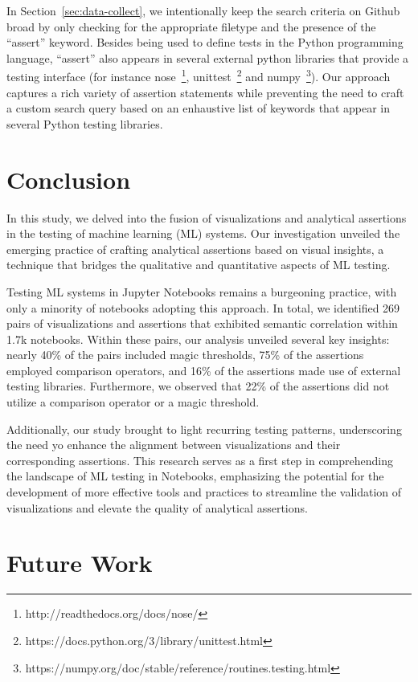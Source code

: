 \documentclass[conference]{IEEEtran}
\begin{document}
In Section~\ref{sec:data-collect}, we intentionally keep the search criteria on Github broad by only checking for the appropriate filetype and the presence of the ``assert'' keyword. Besides being used to define tests in the Python programming language, ``assert'' also appears in several external python libraries that provide a testing interface (for instance nose~\footnote{http://readthedocs.org/docs/nose/}, unittest~\footnote{https://docs.python.org/3/library/unittest.html} and numpy~\footnote{https://numpy.org/doc/stable/reference/routines.testing.html}). Our approach captures a rich variety of assertion statements while preventing the need to craft a custom search query based on an enhaustive list of keywords that appear in several Python testing libraries.

\section{Conclusion}\label{sec:conclude}


In this study, we delved into the fusion of visualizations and analytical assertions in the testing of machine learning (ML) systems. Our investigation unveiled the emerging practice of crafting analytical assertions based on visual insights, a technique that bridges the qualitative and quantitative aspects of ML testing.

Testing ML systems in Jupyter Notebooks remains a burgeoning practice, with only a minority of notebooks adopting this approach. In total, we identified 269 pairs of visualizations and assertions that exhibited semantic correlation within 1.7k notebooks. Within these pairs, our analysis unveiled several key insights: nearly 40\% of the pairs included magic thresholds, 75\% of the assertions employed comparison operators, and 16\% of the assertions made use of external testing libraries. Furthermore, we observed that 22\% of the assertions did not utilize a comparison operator or a magic threshold.

Additionally, our study brought to light recurring testing patterns, underscoring the need yo enhance the alignment between visualizations and their corresponding assertions.
This research serves as a first step in comprehending the landscape of ML testing in Notebooks, emphasizing the potential for the development of more effective tools and practices to streamline the validation of visualizations and elevate the quality of analytical assertions.

\section{Future Work}\label{sec:fw}
\end{document}
